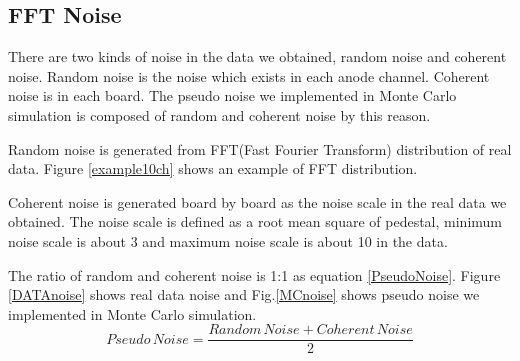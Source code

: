 \subsection{FFT Noise}
There are two kinds of noise in the data we obtained, random noise and coherent noise.
Random noise is the noise which exists in each anode channel.
Coherent noise is in each board.
The pseudo noise we implemented in Monte Carlo simulation is composed of random and coherent noise by this reason.

Random noise is generated from FFT(Fast Fourier Transform) distribution of real data. Figure \ref{example10ch} shows an example of FFT distribution.

Coherent noise is generated board by board as the noise scale in the real data we obtained.
The noise scale is defined as a root mean square of pedestal, minimum noise scale is about 3 and maximum noise scale is about 10 in the data.

The ratio of random and coherent noise is 1:1 as equation \ref{PseudoNoise}.
Figure \ref{DATAnoise} shows real data noise and Fig.\ref{MCnoise} shows pseudo noise we implemented in Monte Carlo simulation.
\begin{equation}
  Pseudo\,Noise = \frac{Random\,Noise + Coherent\,Noise}{2}
  \label{PseudoNoise}
\end{equation}

